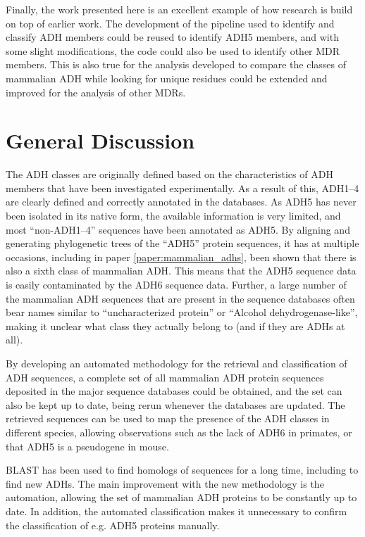 \documentclass[a4paper, twoside, 12pt, openright]{report}
\begin{document}
Finally, the work presented here is an excellent example of how research is build on top of earlier work. The development of the pipeline used to identify and classify ADH members could be reused to identify ADH5 members, and with some slight modifications, the code could also be used to identify other MDR members. This is also true for the analysis developed to compare the classes of mammalian ADH while looking for unique residues could be extended and improved for the analysis of other MDRs.


\chapter{General Discussion}
\label{sec:discussion}

The ADH classes are originally defined based on the characteristics of ADH members that have been investigated experimentally\cite{vallee_isozymes_1983, duester_recommended_1999, hoog_mammalian_2001-1}. As a result of this, ADH1--4 are clearly defined and correctly annotated in the databases. As ADH5 has never been isolated in its native form, the available information is very limited, and most ``non-ADH1--4'' sequences have been annotated as ADH5. By aligning and generating phylogenetic trees of the ``ADH5'' protein sequences, it has at multiple occasions, including in paper \ref{paper:mammalian_adhs}, been shown that there is also a sixth class of mammalian ADH. This means that the ADH5 sequence data is easily contaminated by the ADH6 sequence data. Further, a large number of the mammalian ADH sequences that are present in the sequence databases often bear names similar to ``uncharacterized protein'' or ``Alcohol dehydrogenase-like'', making it unclear what class they actually belong to (and if they are ADHs at all).

By developing an automated methodology for the retrieval and classification of ADH sequences, a complete set of all mammalian ADH protein sequences deposited in the major sequence databases could be obtained, and the set can also be kept up to date, being rerun whenever the databases are updated. The retrieved sequences can be used to map the presence of the ADH classes in different species, allowing observations such as the lack of ADH6 in primates, or that ADH5 is a pseudogene in mouse.

BLAST has been used to find homologs of sequences for a long time, including to find new ADHs. The main improvement with the new methodology is the automation, allowing the set of mammalian ADH proteins to be constantly up to date. In addition, the automated classification makes it unnecessary to confirm the classification of e.g. ADH5 proteins manually.
\end{document}
